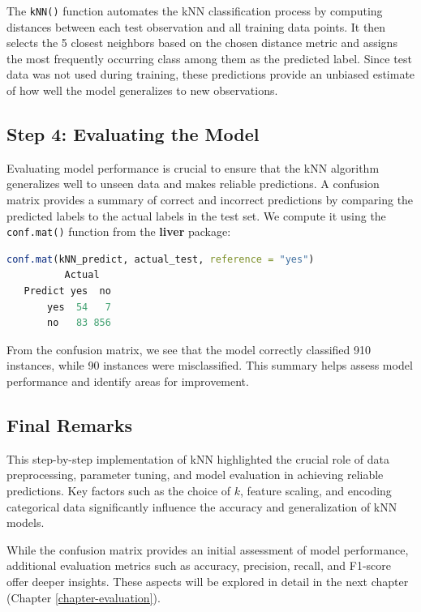 \documentclass[
]{book}
\newcommand{\passthrough}[1]{#1}
\theoremstyle{definition}
\theoremstyle{definition}
\theoremstyle{definition}
\theoremstyle{definition}
\theoremstyle{remark}
\begin{document}
The \passthrough{\lstinline!kNN()!} function automates the kNN classification process by computing distances between each test observation and all training data points. It then selects the 5 closest neighbors based on the chosen distance metric and assigns the most frequently occurring class among them as the predicted label. Since test data was not used during training, these predictions provide an unbiased estimate of how well the model generalizes to new observations.

\subsection{Step 4: Evaluating the Model}\label{step-4-evaluating-the-model}

Evaluating model performance is crucial to ensure that the kNN algorithm generalizes well to unseen data and makes reliable predictions. A confusion matrix provides a summary of correct and incorrect predictions by comparing the predicted labels to the actual labels in the test set. We compute it using the \passthrough{\lstinline!conf.mat()!} function from the \textbf{liver} package:

\begin{lstlisting}[language=R]
conf.mat(kNN_predict, actual_test, reference = "yes")
          Actual
   Predict yes  no
       yes  54   7
       no   83 856
\end{lstlisting}

From the confusion matrix, we see that the model correctly classified 910 instances, while 90 instances were misclassified. This summary helps assess model performance and identify areas for improvement.

\subsection*{Final Remarks}\label{final-remarks}

This step-by-step implementation of kNN highlighted the crucial role of data preprocessing, parameter tuning, and model evaluation in achieving reliable predictions. Key factors such as the choice of \(k\), feature scaling, and encoding categorical data significantly influence the accuracy and generalization of kNN models.

While the confusion matrix provides an initial assessment of model performance, additional evaluation metrics such as accuracy, precision, recall, and F1-score offer deeper insights. These aspects will be explored in detail in the next chapter (Chapter \ref{chapter-evaluation}).
\end{document}
